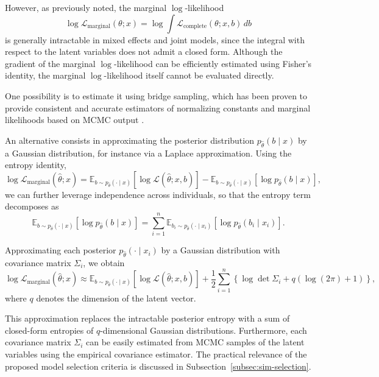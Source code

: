 \documentclass{sn-jnl}
\begin{document}
However, as previously noted, the marginal $\log$-likelihood
\[
\log \mathcal{L}_\mathrm{marginal}(\theta; x)
= \log \int \mathcal{L}_\mathrm{complete}(\theta; x, b) \, db
\]
is generally intractable in mixed effects and joint models, since the integral with respect to the latent variables does not admit a closed form. Although the gradient of the marginal $\log$-likelihood can be efficiently estimated using Fisher's identity, the marginal $\log$-likelihood itself cannot be evaluated directly.

One possibility is to estimate it using bridge sampling, which has been proven to provide consistent and accurate estimators of normalizing constants and marginal likelihoods based on MCMC output \citep{meng1996simulating, gronau2017tutorial}. 

\bigbreak

An alternative consists in approximating the posterior distribution $p_{\hat{\theta}}(b \mid x)$ by a Gaussian distribution, for instance via a Laplace approximation. Using the entropy identity,
\[
\log \mathcal{L}_\mathrm{marginal}(\hat{\theta}; x) = \mathbb{E}_{b \sim p_{\hat{\theta}}(\cdot \mid x)} \left[ \log \mathcal{L}(\hat{\theta}; x, b) \right] - \mathbb{E}_{b \sim p_{\hat{\theta}}(\cdot \mid x)} \left[ \log p_{\hat{\theta}}(b \mid x) \right],
\]
we can further leverage independence across individuals, so that the entropy term decomposes as
\[
\mathbb{E}_{b \sim p_{\hat{\theta}}(\cdot \mid x)} \left[ \log p_{\hat{\theta}}(b \mid x) \right] = \sum_{i=1}^n \mathbb{E}_{b_i \sim p_{\hat{\theta}}(\cdot \mid x_i)} \left[ \log p_{\hat{\theta}}(b_i \mid x_i) \right].
\]

Approximating each posterior $p_{\hat{\theta}}(\cdot \mid x_i)$ by a Gaussian distribution with covariance matrix $\Sigma_i$, we obtain
\[
\log \mathcal{L}_\mathrm{marginal}(\hat{\theta}; x) \approx \mathbb{E}_{b \sim p_{\hat{\theta}}(\cdot \mid x)} \left[ \log \mathcal{L}(\hat{\theta}; x, b) \right] + \frac{1}{2} \sum_{i=1}^n \left\{ \log \det \Sigma_i + q\left( \log(2\pi) + 1 \right) \right\},
\]
where $q$ denotes the dimension of the latent vector.

This approximation replaces the intractable posterior entropy with a sum of closed-form entropies of $q$-dimensional Gaussian distributions. Furthermore, each covariance matrix $\Sigma_i$ can be easily estimated from MCMC samples of the latent variables using the empirical covariance estimator. The practical relevance of the proposed model selection criteria is discussed in Subsection~\ref{subsec:sim-selection}.
\end{document}
